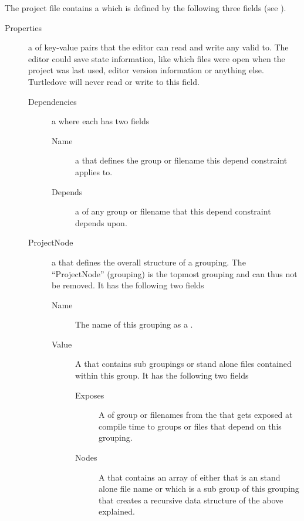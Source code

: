 The project file contains a  which is defined by the
following three fields (see ).
 
  

\begin{description}
\item[Properties] a  of key-value pairs that the editor can
  read and write any valid  to. The editor could save state
  information, like which files were open when the project was last used,
  editor version information or anything else. Turtledove will never read or
  write to this field.
  
  \begin{description}
  \item[Dependencies] a  where each 
    has two fields
    
    \begin{description}
    \item[Name] a  that defines the group or filename this
      depend constraint applies to.
      
    \item[Depends] a  of any group or filename that this
      depend constraint depends upon.
    \end{description}
    
    
  \item[ProjectNode] a  that defines the overall
    structure of a grouping. The ``ProjectNode'' (grouping) is the topmost
    grouping and can thus not be removed. It has the following two fields
    
    \begin{description}
    \item[Name] The name of this grouping as a .
      
    \item[Value] A  that contains sub groupings or
      stand alone files contained within this group. It has the following two fields
      
      \begin{description}
      \item[Exposes] A  of group or filenames from the
         that gets exposed at compile time to groups or files
        that depend on this grouping.
        
      \item[Nodes] A  that contains an array of either
         that is an stand alone file name or
         which is a sub group of this grouping that
        creates a recursive data structure of the above explained.
      \end{description}
    \end{description}      
  \end{description}
\end{description}


